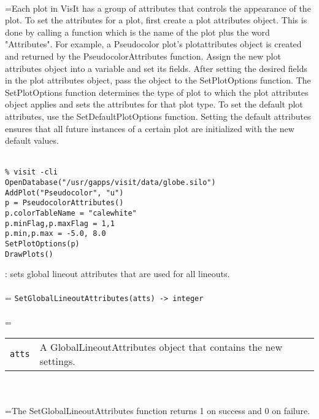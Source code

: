 \documentclass[10pt,a4paper]{report}
\begin{document}
 \\ 
\hangindent=\parindent Each plot in VisIt has a group of attributes that controls the appearance of the plot. To set the attributes for a plot, first create a plot attributes object. This is done by calling a function which is the name of the plot plus the word "Attributes". For example, a Pseudocolor plot's plotattributes object is created and returned by the PseudocolorAttributes function. Assign the new plot attributes object into a variable and set its fields. After setting the desired fields in the plot attributes object, pass the object to the SetPlotOptions function. The SetPlotOptions function determines the type of plot to which the plot attributes object applies and sets the attributes for that plot type. To set the default plot attributes, use the SetDefaultPlotOptions function. Setting the default attributes ensures that all future instances of a certain plot are initialized with the new default values. \\[-3mm] 

\\[-6mm]
\begin{verbatim}% visit -cli
OpenDatabase("/usr/gapps/visit/data/globe.silo")
AddPlot("Pseudocolor", "u")
p = PseudocolorAttributes()
p.colorTableName = "calewhite"
p.minFlag,p.maxFlag = 1,1
p.min,p.max = -5.0, 8.0
SetPlotOptions(p)
DrawPlots()
\end{verbatim}
\newpage


{}
: sets global lineout attributes that are used for all lineouts.\\[-3mm]

 \\ 
\hangindent=\parindent 
\verb!SetGlobalLineoutAttributes(atts) -> integer!\\ [-3mm]

 \\ 
\hangindent=\parindent 
\begin{tabular}{lp{9cm}}
\verb!atts! & A GlobalLineoutAttributes object that contains the new settings. \\
\end{tabular} \\[-2mm]


 \\ 
\hangindent=\parindent The SetGlobalLineoutAttributes function returns 1 on success and 0 on failure. \\[-3mm] 
\end{document}
